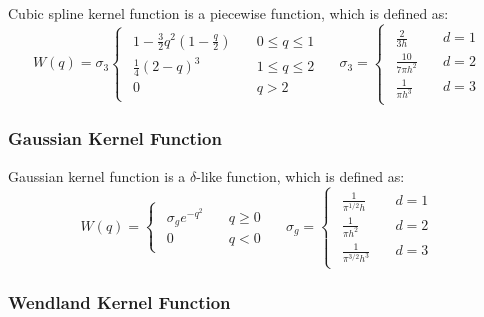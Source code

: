 Cubic spline kernel function is a piecewise function,
which is defined as:
\begin{equation}
    W(q)=\sigma_3
    \begin{cases}
        \begin{aligned}
            1-\frac{3}{2}q^2\left(1-\frac{q}{2}\right)\quad &0\leq q \leq 1 \\
            \frac{1}{4}(2-q)^3\quad &1\leq q \leq 2 \\
            0\quad &q > 2
        \end{aligned}
    \end{cases}\quad
    \sigma_3=
    \begin{cases}
        \begin{aligned}
            \frac{2}{3h} \quad &d=1 \\
            \frac{10}{7\pi h^2} \quad &d=2 \\
            \frac{1}{\pi h^3} \quad &d=3
        \end{aligned}
    \end{cases}
\end{equation}

\subsubsection{Gaussian Kernel Function}

Gaussian kernel function is a $\delta$-like function,
which is defined as:
\begin{equation}
    W(q)=
    \begin{cases}
        \begin{aligned}
            \sigma_g e^{-q^2}\quad &q \geq 0 \\
            0\quad &q < 0
        \end{aligned}
    \end{cases}\quad
    \sigma_g=
    \begin{cases}
        \begin{aligned}
            \frac{1}{\pi^{1/2}h} \quad &d=1 \\
            \frac{1}{\pi h^2} \quad &d=2 \\
            \frac{1}{\pi^{3/2} h^3} \quad &d=3
        \end{aligned}
    \end{cases}
\end{equation}

\subsubsection{Wendland Kernel Function}

